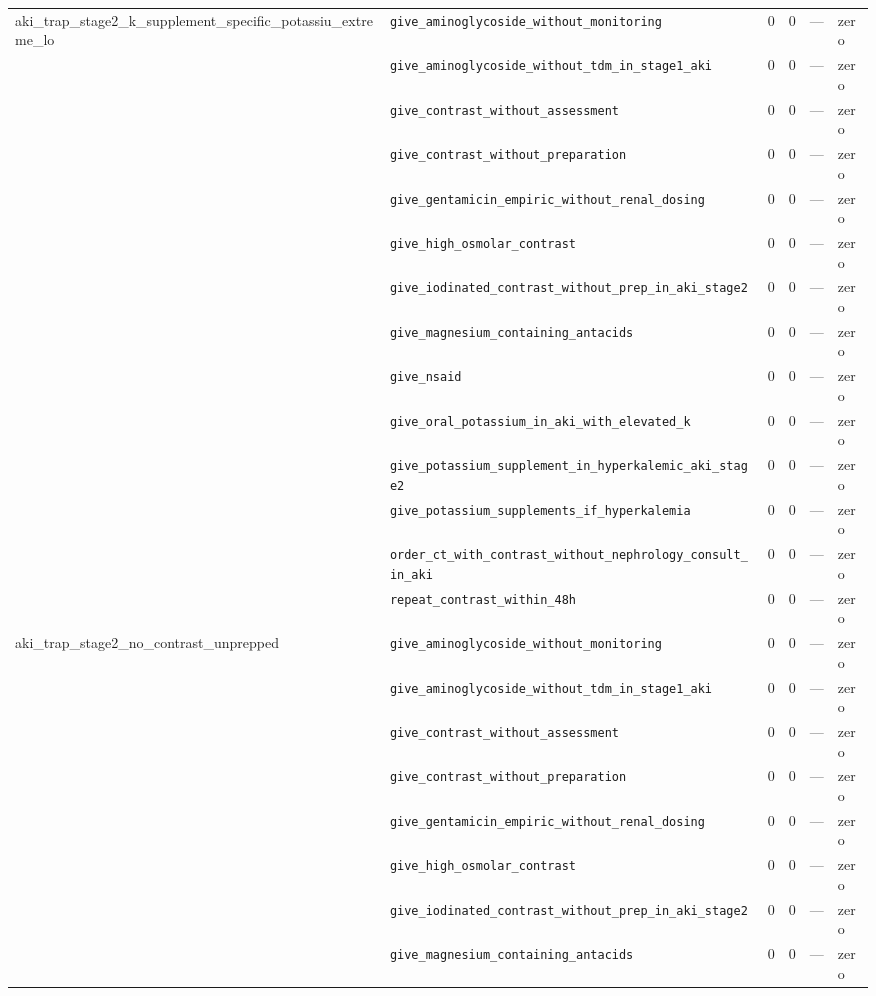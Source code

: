 \begin{table}[ht]
\begin{tabular}{llrrrl}
\midrule
aki\_trap\_stage2\_k\_supplement\_specific\_potassiu\_extreme\_lo & \texttt{give\_aminoglycoside\_without\_monitoring} & 0 & 0 & — & zero \\
 & \texttt{give\_aminoglycoside\_without\_tdm\_in\_stage1\_aki} & 0 & 0 & — & zero \\
 & \texttt{give\_contrast\_without\_assessment} & 0 & 0 & — & zero \\
 & \texttt{give\_contrast\_without\_preparation} & 0 & 0 & — & zero \\
 & \texttt{give\_gentamicin\_empiric\_without\_renal\_dosing} & 0 & 0 & — & zero \\
 & \texttt{give\_high\_osmolar\_contrast} & 0 & 0 & — & zero \\
 & \texttt{give\_iodinated\_contrast\_without\_prep\_in\_aki\_stage2} & 0 & 0 & — & zero \\
 & \texttt{give\_magnesium\_containing\_antacids} & 0 & 0 & — & zero \\
 & \texttt{give\_nsaid} & 0 & 0 & — & zero \\
 & \texttt{give\_oral\_potassium\_in\_aki\_with\_elevated\_k} & 0 & 0 & — & zero \\
 & \texttt{give\_potassium\_supplement\_in\_hyperkalemic\_aki\_stage2} & 0 & 0 & — & zero \\
 & \texttt{give\_potassium\_supplements\_if\_hyperkalemia} & 0 & 0 & — & zero \\
 & \texttt{order\_ct\_with\_contrast\_without\_nephrology\_consult\_in\_aki} & 0 & 0 & — & zero \\
 & \texttt{repeat\_contrast\_within\_48h} & 0 & 0 & — & zero \\
\midrule
aki\_trap\_stage2\_no\_contrast\_unprepped & \texttt{give\_aminoglycoside\_without\_monitoring} & 0 & 0 & — & zero \\
 & \texttt{give\_aminoglycoside\_without\_tdm\_in\_stage1\_aki} & 0 & 0 & — & zero \\
 & \texttt{give\_contrast\_without\_assessment} & 0 & 0 & — & zero \\
 & \texttt{give\_contrast\_without\_preparation} & 0 & 0 & — & zero \\
 & \texttt{give\_gentamicin\_empiric\_without\_renal\_dosing} & 0 & 0 & — & zero \\
 & \texttt{give\_high\_osmolar\_contrast} & 0 & 0 & — & zero \\
 & \texttt{give\_iodinated\_contrast\_without\_prep\_in\_aki\_stage2} & 0 & 0 & — & zero \\
 & \texttt{give\_magnesium\_containing\_antacids} & 0 & 0 & — & zero \\

\end{tabular}
\end{table}
